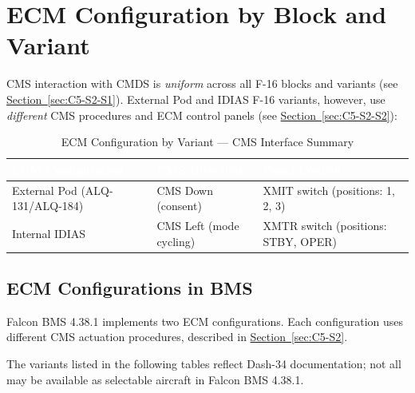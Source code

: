 \documentclass[11pt, a4paper, twoside]{report}
\newcommand{\secref}[1]{\hyperref[#1]{Section~\ref*{#1}}}
\begin{document}
\section{ECM Configuration by Block and Variant}
\label{sec:C5-S3}

CMS interaction with CMDS is \textit{uniform} across all F-16 blocks and variants (see \secref{sec:C5-S2-S1}). External Pod and IDIAS F-16 variants, however, use \textit{different} CMS procedures and ECM control panels (see \secref{sec:C5-S2-S2}):

\begin{table}[H]
\centering
\caption{ECM Configuration by Variant --- CMS Interface Summary}
\label{tab:C5-S3-ecm-config-summary}
\small
\renewcommand{\arraystretch}{1.25}
\begin{tabular}{|>{\raggedright\arraybackslash}p{3.6cm}|>{\raggedright\arraybackslash}p{3.6cm}|>{\raggedright\arraybackslash}p{4.6cm}|}
\hline
\rowcolor{headerblue}
\textcolor{white}{\textbf{ECM Configuration}} & \textcolor{white}{\textbf{CMS Direction}} & \textcolor{white}{\textbf{Panel Control}} \\
\hline
External Pod (ALQ-131/ALQ-184) & CMS Down (consent) & XMIT switch (positions: 1, 2, 3) \\
\hline
Internal IDIAS & CMS Left (mode cycling) & XMTR switch (positions: STBY, OPER) \\
\hline
\end{tabular}
\end{table}

\subsection{ECM Configurations in BMS}
\label{sec:C5-S3-S1}

Falcon BMS 4.38.1 implements two ECM configurations. Each configuration uses different CMS actuation procedures, described in \secref{sec:C5-S2}.

The variants listed in the following tables reflect Dash-34 documentation; not all may be available as selectable aircraft in Falcon BMS 4.38.1.

\end{document}
